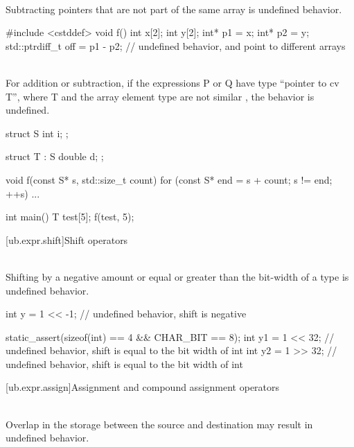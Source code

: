 {\pnum
{} \\
Subtracting pointers that are not part of the same array is undefined behavior.

\pnum
\begin{example}
\begin{codeblock}
#include <cstddef>
void f() {
  int x[2];
  int y[2];
  int* p1 = x;
  int* p2 = y;
  std::ptrdiff_t off = p1 - p2; // undefined behavior,  and  point to different arrays
}
\end{codeblock}
\end{example}

\pnum
{} \\
For addition or subtraction, if the expressions P or Q have type ``pointer to cv T'', where T and the array
element type are not similar , the behavior is undefined.

\pnum
\begin{example}
\begin{codeblock}
struct S {
  int i;
};

struct T : S {
  double d;
};

void f(const S* s, std::size_t count) {
  for (const S* end = s + count; s != end; ++s) {
    ...
  }
}

int main() {
  T test[5];
  f(test, 5);
}
\end{codeblock}
\end{example}


[ub.expr.shift]{Shift operators}

\pnum
{} \\
Shifting by a negative amount or equal or greater than the bit-width of a type is undefined behavior.

\pnum
\begin{example}
\begin{codeblock}
int y = 1 << -1;        // undefined behavior, shift is negative

static_assert(sizeof(int) == 4 && CHAR_BIT == 8);
int y1 = 1 << 32;       // undefined behavior, shift is equal to the bit width of int
int y2 = 1 >> 32;       // undefined behavior, shift is equal to the bit width of int
\end{codeblock}
\end{example}


[ub.expr.assign]{Assignment and compound assignment operators}

\pnum
{} \\
Overlap in the storage between the source and destination may result in undefined behavior.

}
